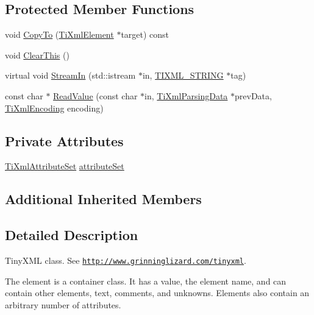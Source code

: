 \subsection*{Protected Member Functions}
\begin{DoxyCompactItemize}
\item 
void \hyperlink{class_ti_xml_element_ab931f2208ed76ba03465d8a1f86b5935}{Copy\+To} (\hyperlink{class_ti_xml_element}{Ti\+Xml\+Element} $\ast$target) const
\item 
void \hyperlink{class_ti_xml_element_a5670933ec2d7d9763b9891acc05d7f7d}{Clear\+This} ()
\item 
virtual void \hyperlink{class_ti_xml_element_acc42052299e0bcf04871f3c2d229fe93}{Stream\+In} (std\+::istream $\ast$in, \hyperlink{tinyxml_8h_a92bada05fd84d9a0c9a5bbe53de26887}{T\+I\+X\+M\+L\+\_\+\+S\+T\+R\+I\+NG} $\ast$tag)
\item 
const char $\ast$ \hyperlink{class_ti_xml_element_ac786bce103042d3837c4cc2ff6967d41}{Read\+Value} (const char $\ast$in, \hyperlink{class_ti_xml_parsing_data}{Ti\+Xml\+Parsing\+Data} $\ast$prev\+Data, \hyperlink{tinyxml_8h_a88d51847a13ee0f4b4d320d03d2c4d96}{Ti\+Xml\+Encoding} encoding)
\end{DoxyCompactItemize}
\subsection*{Private Attributes}
\begin{DoxyCompactItemize}
\item 
\hyperlink{class_ti_xml_attribute_set}{Ti\+Xml\+Attribute\+Set} \hyperlink{class_ti_xml_element_a56d7e69380c3cc938bf213d2857791b2}{attribute\+Set}
\end{DoxyCompactItemize}
\subsection*{Additional Inherited Members}


\subsection{Detailed Description}
Tiny\+X\+ML class. See \href{http://www.grinninglizard.com/tinyxml}{\tt http\+://www.\+grinninglizard.\+com/tinyxml}. 

The element is a container class. It has a value, the element name, and can contain other elements, text, comments, and unknowns. Elements also contain an arbitrary number of attributes.

